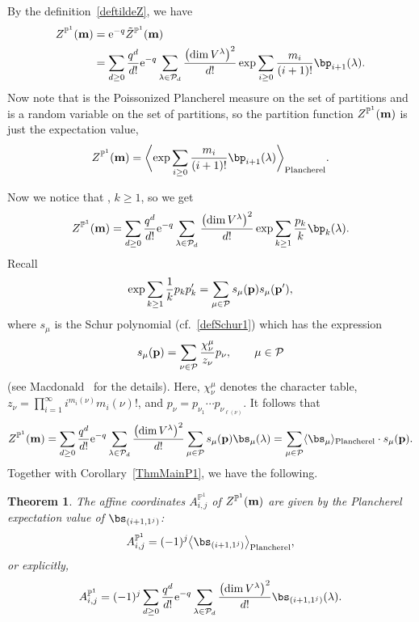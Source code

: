 \documentclass[pdftex]{sigma}
\newcommand{\corr}[1]{\langle {#1} \rangle}
\newcommand{\Corr}[1]{\biggl\langle {#1} \biggr\rangle}
\newcommand{\bP}{\mathbb{P}}
\newcommand{\be}{\begin{equation}}
\newcommand{\ee}{\end{equation}}
\numberwithin{equation}{section}
\newtheorem{Theorem}{Theorem}[section]
\begin{document}
By the definition~\eqref{deftildeZ}, we have
\begin{align*}
Z^{\bP^1}({\bf m}) & =
 {\rm e}^{-q} \tilde{Z}^{\bP^1}({\bf m}) \\
& = \sum_{d\geq 0} \frac{q^d}{d!}{\rm e}^{-q}
\sum_{\lambda \in \mathcal{P}_d} \frac{\bigl(\dim V^\lambda\bigr)^2}{d!}
\exp \sum_{i\ge0} \frac{m_i}{(i+1)!} \bp_{i+1}(\lambda).
\end{align*}
Now note that
is the Poissonized Plancherel measure on the set of partitions and
is a random variable on the set of partitions,
so the partition function $ Z^{\bP^1}({\bf m})$ is just the expectation value,
\[
 Z^{\bP^1}({\bf m}) = \Corr{\exp \sum_{i\ge0} \frac{m_i}{(i+1)!} \bp_{i+1}(\lambda)}_{\rm Plancherel}.
\]

Now we notice that , $k\ge1$,
so we get
\[
 Z^{\bP^1}({\bf m}) = \sum_{d\geq 0} \frac{q^d}{d!}{\rm e}^{-q}
\sum_{\lambda \in \mathcal{P}_d} \frac{\bigl(\dim V^\lambda\bigr)^2}{d!}
\exp \sum_{k\ge1} \frac{p_k}{k} \bp_{k}(\lambda).
\]
Recall
\[
\exp \sum_{k\ge1} \frac1k p_k p_k' = \sum_{\mu\in \mathcal{P}} s_\mu({\bf p})s_\mu({\bf p}'),
\]
where $s_\mu$ is the Schur polynomial (cf.\ \eqref{defSchur1}) which has the expression
\be\label{Schurdef2}
s_\mu({\bf p}) = \sum_{\nu\in\mathcal{P}} \frac{\chi^\mu_\nu}{z_\nu} p_\nu, \qquad \mu\in\mathcal{P}
\ee
(see Macdonald~\cite{Mac} for the details).
Here,
$\chi^\mu_\nu$ denotes the character table, $z_\nu\!=\!\prod_{i=1}^\infty i^{m_i(\nu)} m_i(\nu)!$, and
$p_\nu=p_{\nu_1}\cdots p_{\nu_{\ell(\nu)}}$.
It follows that %
\begin{align*}
 Z^{\bP^1}({\bf m}) = \sum_{d\geq 0} \frac{q^d}{d!}{\rm e}^{-q}
\sum_{\lambda\in \mathcal{P}_d} \frac{\bigl(\dim V^\lambda\bigr)^2}{d!}
 \sum_{\mu\in\mathcal{P}} s_\mu({\bf p}) \bs_{\mu}(\lambda)
 = \sum_{\mu\in\mathcal{P}} \corr{\bs_\mu}_{\rm Plancherel} \cdot s_\mu({\bf p}).
\end{align*}
Together with Corollary~\ref{ThmMainP1}, we have the following.

\begin{Theorem}\label{affinemeasure}
The affine coordinates $A_{i,j}^{\bP^1}$ of $Z^{\bP^1}({\bf m})$ are given by the Plancherel expectation value
of $\bs_{(i+1, 1^j)}$:
\[
A_{i,j}^{\bP^1} = (-1)^j \bigl\langle\bs_{(i+1,1^j)}\bigr\rangle_{\rm Plancherel},
\]
or explicitly,
\[
A_{i,j}^{\bP^1} = (-1)^j \sum_{d\geq 0} \frac{q^d}{d!}{\rm e}^{-q}
\sum_{\lambda \in \mathcal{P}_d} \frac{\bigl(\dim V^\lambda\bigr)^2}{d!} \bs_{(i+1,1^j)}(\lambda).
\]
\end{Theorem}
\end{document}
